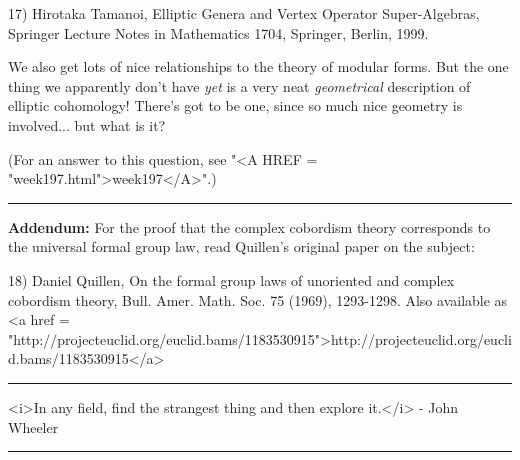 17) Hirotaka Tamanoi, Elliptic Genera and Vertex Operator Super-Algebras,
Springer Lecture Notes in Mathematics 1704, Springer, Berlin, 1999.

We also get lots of nice relationships to the theory of modular forms.
But the one thing we apparently don't have \emph{yet} is a very neat 
\emph{geometrical} description of elliptic cohomology!  There's got to be 
one, since so much nice geometry is involved... but what is it?


(For an answer to this question, 
see "<A HREF = "week197.html">week197</A>".)


 \par\noindent\rule{\textwidth}{0.4pt}
\textbf{Addendum:} For the proof that the complex cobordism theory
corresponds to the universal formal group law, read Quillen's original
paper on the subject:

18) Daniel Quillen, On the formal group laws of unoriented and complex 
cobordism theory, Bull. Amer. Math. Soc. 75 (1969), 1293-1298. 
Also available as <a href = "http://projecteuclid.org/euclid.bams/1183530915">http://projecteuclid.org/euclid.bams/1183530915</a>



 \par\noindent\rule{\textwidth}{0.4pt}
<i>In any field, find the strangest thing and then explore it.</i> - 
John Wheeler


 \par\noindent\rule{\textwidth}{0.4pt}

